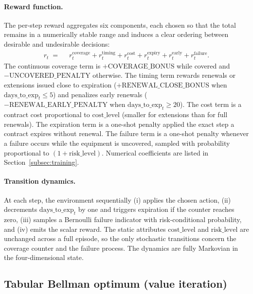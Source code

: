 \paragraph{Reward function.}
The per-step reward aggregates six components, each chosen so that the
total remains in a numerically stable range and induces a clear ordering
between desirable and undesirable decisions:
\begin{align*}
r_t \;=\; &\; r^{\text{coverage}}_t
          + r^{\text{timing}}_t
          + r^{\text{cost}}_t
          + r^{\text{expiry}}_t
          + r^{\text{early}}_t
          + r^{\text{failure}}_t.
\end{align*}
The continuous coverage term is $+\mathrm{COVERAGE\_BONUS}$ while covered
and $-\mathrm{UNCOVERED\_PENALTY}$ otherwise. The timing term rewards
renewals or extensions issued close to expiration
($+\mathrm{RENEWAL\_CLOSE\_BONUS}$ when
$\mathrm{days\_to\_exp}_t \le 5$) and penalizes early renewals
($-\mathrm{RENEWAL\_EARLY\_PENALTY}$ when
$\mathrm{days\_to\_exp}_t \ge 20$). The cost term is a contract cost
proportional to $\mathrm{cost\_level}$ (smaller for extensions than for
full renewals). The expiration term is a one-shot penalty applied the
exact step a contract expires without renewal. The failure term is a
one-shot penalty whenever a failure occurs while the equipment is
uncovered, sampled with probability proportional to
$(1 + \mathrm{risk\_level})$. Numerical coefficients are listed in
Section~\ref{subsec:training}.


\paragraph{Transition dynamics.}
At each step, the environment sequentially (i) applies the chosen action,
(ii) decrements $\mathrm{days\_to\_exp}_t$ by one and triggers expiration
if the counter reaches zero, (iii) samples a Bernoulli failure indicator
with risk-conditional probability, and (iv) emits the scalar reward. The
static attributes $\mathrm{cost\_level}$ and $\mathrm{risk\_level}$ are
unchanged across a full episode, so the only stochastic transitions
concern the coverage counter and the failure process. The dynamics are
fully Markovian in the four-dimensional state.


\subsection{Tabular Bellman optimum (value iteration)}
\label{subsec:vi-baseline}

